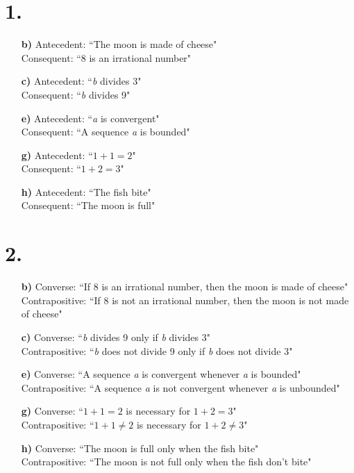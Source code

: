 \documentclass[12pt,letterpaper]{article}
\begin{document}
\section*{1.}
\begin{enumerate}
	\item[\textbf{b)}]
		Antecedent: ``The moon is made of cheese"\\
		Consequent: ``8 is an irrational number"
	\item[\textbf{c)}]
		Antecedent: ``\textit{b} divides 3"\\
		Consequent: ``\textit{b} divides 9"
	\item[\textbf{e)}]
		Antecedent: ``\textit{a} is convergent"\\
		Consequent: ``A sequence \textit{a} is bounded"
	\item[\textbf{g)}]
		Antecedent: ``$1+1=2$"\\
		Consequent: ``$1+2=3$" 
	\item[\textbf{h)}]
		Antecedent: ``The fish bite"\\
		Consequent: ``The moon is full" 
\end{enumerate}


\section*{2.}
\begin{enumerate}
	\item[\textbf{b)}]
		Converse: ``If 8 is an irrational number, then the moon is made of cheese"\\
		Contrapositive: ``If 8 is not an irrational number, then the moon is not made of cheese" 
	\item[\textbf{c)}]
		Converse: ``\textit{b} divides 9 only if \textit{b} divides 3"\\
		Contrapositive: ``\textit{b} does not divide 9 only if \textit{b} does not divide 3"  
	\item[\textbf{e)}]
		Converse: ``A sequence \textit{a} is convergent whenever \textit{a} is bounded"\\
		Contrapositive: ``A sequence \textit{a} is not convergent whenever \textit{a} is unbounded"  
	\item[\textbf{g)}]
		Converse: ``$1+1=2$ is necessary for $1+2=3$"\\
		Contrapositive: ``$1+1\neq2$ is necessary for $1+2\neq3$"  
	\item[\textbf{h)}]
		Converse: ``The moon is full only when the fish bite"\\
		Contrapositive: ``The moon is not full only when the fish don't bite"  
\end{enumerate}
\end{document}
